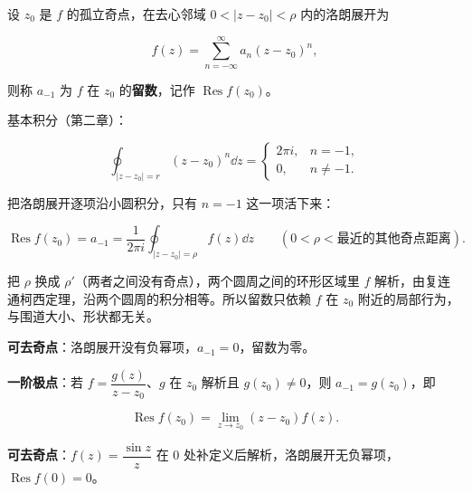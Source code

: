 \documentclass[11pt]{ctexart}
\let\origsubhdr\subhdr
\renewcommand{\subhdr}[1]{\par\needspace{4\baselineskip}\origsubhdr{#1}}
\let\orighdr\hdr
\renewcommand{\hdr}[2]{\par\orighdr{#1}{#2}}
\begin{document}





设 $z_0$ 是 $f$ 的孤立奇点，在去心邻域 $0<|z-z_0|<\rho$ 内的洛朗展开为

\[ f(z)=\sum_{n=-\infty}^{\infty}a_n(z-z_0)^n , \]

则称 $a_{-1}$ 为 $f$ 在 $z_0$ 的\textbf{留数}，记作 $\operatorname{Res}f(z_0)$。


基本积分（第二章）：

\[ \oint_{|z-z_0|=r}(z-z_0)^n\dd z=\begin{cases}2\pi i,& n=-1,\\ 0,& n\ne-1.\end{cases} \]

把洛朗展开逐项沿小圆积分，只有 $n=-1$ 这一项活下来：

\[ \operatorname{Res}f(z_0)=a_{-1}=\frac{1}{2\pi i}\oint_{|z-z_0|=\rho}f(z)\dd z\qquad(0<\rho<\text{最近的其他奇点距离}) . \]


把 $\rho$ 换成 $\rho'$（两者之间没有奇点），两个圆周之间的环形区域里 $f$ 解析，由复连通柯西定理，沿两个圆周的积分相等。所以留数只依赖 $f$ 在 $z_0$ 附近的局部行为，与围道大小、形状都无关。


\textbf{可去奇点}：洛朗展开没有负幂项，$a_{-1}=0$，留数为零。

\textbf{一阶极点}：若 $f=\dfrac{g(z)}{z-z_0}$、$g$ 在 $z_0$ 解析且 $g(z_0)\ne0$，则 $a_{-1}=g(z_0)$，即

\[ \operatorname{Res}f(z_0)=\lim_{z\to z_0}(z-z_0)f(z) . \]


\textbf{可去奇点}：$f(z)=\dfrac{\sin z}{z}$ 在 $0$ 处补定义后解析，洛朗展开无负幂项，$\operatorname{Res}f(0)=0$。
\end{document}
